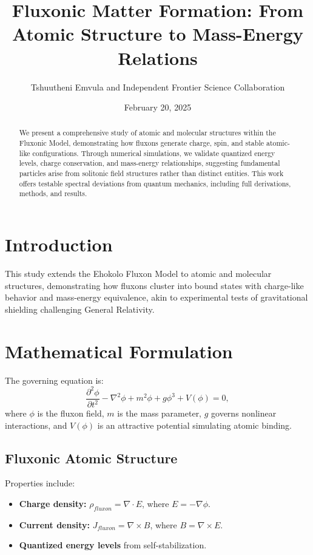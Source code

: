 \documentclass{article}
\title{Fluxonic Matter Formation: From Atomic Structure to Mass-Energy Relations}
\author{Tshuutheni Emvula and Independent Frontier Science Collaboration}
\date{February 20, 2025}
\begin{document}
\maketitle

\begin{abstract}
We present a comprehensive study of atomic and molecular structures within the Fluxonic Model, demonstrating how fluxons generate charge, spin, and stable atomic-like configurations. Through numerical simulations, we validate quantized energy levels, charge conservation, and mass-energy relationships, suggesting fundamental particles arise from solitonic field structures rather than distinct entities. This work offers testable spectral deviations from quantum mechanics, including full derivations, methods, and results.
\end{abstract}

\section{Introduction}
This study extends the Ehokolo Fluxon Model to atomic and molecular structures, demonstrating how fluxons cluster into bound states with charge-like behavior and mass-energy equivalence, akin to experimental tests of gravitational shielding challenging General Relativity.

\section{Mathematical Formulation}
The governing equation is:
\begin{equation}
\frac{\partial^2 \phi}{\partial t^2} - \nabla^2 \phi + m^2 \phi + g \phi^3 + V(\phi) = 0,
\end{equation}
where \(\phi\) is the fluxon field, \(m\) is the mass parameter, \(g\) governs nonlinear interactions, and \(V(\phi)\) is an attractive potential simulating atomic binding.

\subsection{Fluxonic Atomic Structure}
Properties include:
\begin{itemize}
    \item \textbf{Charge density:} \(\rho_{fluxon} = \nabla \cdot E\), where \(E = -\nabla \phi\).
    \item \textbf{Current density:} \(J_{fluxon} = \nabla \times B\), where \(B = \nabla \times E\).
    \item \textbf{Quantized energy levels} from self-stabilization.
\end{itemize}
\end{document}
